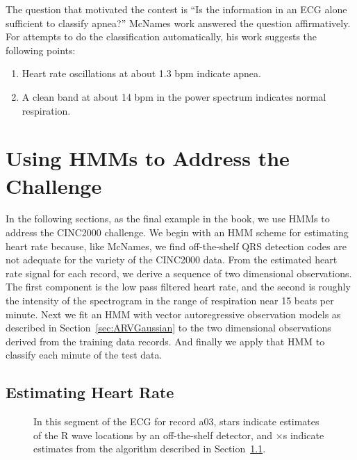 The question that motivated the contest is ``Is the information in an
ECG alone sufficient to classify apnea?'' McNames work answered the
question affirmatively.  For attempts to do the classification
automatically, his work suggests the following points:
\begin{enumerate}
\item Heart rate oscillations at about 1.3 bpm indicate apnea.
\item A clean band at about 14 bpm in the power spectrum indicates
  normal respiration.
\end{enumerate}

\afterpage{\clearpage}%

\section{Using HMMs to Address the Challenge}
\label{sec:apnea_hmms}

In the following sections, as the final example in the book, we use
HMMs to address the CINC2000 challenge.  We begin with an HMM scheme
for estimating heart rate because, like McNames, we find off-the-shelf
QRS detection codes are not adequate for the variety of the CINC2000
data.  From the estimated heart rate signal for each record, we derive
a sequence of two dimensional observations.  The first component is
the low pass filtered heart rate, and the second is roughly the
intensity of the spectrogram in the range of respiration near 15
beats per minute.  Next we fit an HMM with vector autoregressive
observation models as described in Section~\ref{sec:ARVGaussian} to
the two dimensional observations derived from the training data
records.  And finally we apply that HMM to classify each minute of the
test data.

\subsection{Estimating Heart Rate}
\label{sec:ecg_hmms}

\begin{figure}
  \caption[Inadequate off-the-shelf ECG detectors]%
  {In this segment of the ECG for record a03, stars indicate estimates
    of the R wave locations by an off-the-shelf detector\cite{porr},
    and $\times$s indicate estimates from the algorithm described in
    Section~\ref{sec:ecg_hmms}. }
  \label{fig:elgendi}
\end{figure}

